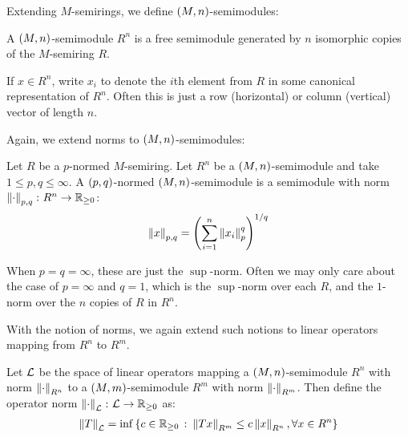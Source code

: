Extending \(M\)-semirings,
we define \(\left(M, n\right)\)-semimodules:

\begin{definition}
  A \(\left(M, n\right)\)-semimodule \(R ^n\)
  is a free semimodule generated by \(n\) isomorphic copies of
  the \(M\)-semiring \(R\).
\end{definition}

If \(x \in R ^n\), write \(x_i\) to denote the \(i\)th element from
\(R\) in some canonical representation of \(R ^n\).
Often this is just a row (horizontal) or column (vertical)
vector of length \(n\).

Again, we extend norms to \(\left(M, n\right)\)-semimodules:

\begin{definition}
  Let \(R\) be a \(p\)-normed \(M\)-semiring.
  Let \(R ^n\) be a \(\left(M, n\right)\)-semimodule
  and take \(1 \leq p, q \leq \infty\).
  A \(\left(p, q\right)\)-normed \(\left(M, n\right)\)-semimodule
  is a semimodule with norm \(\left\lVert\cdot\right\rVert_{p, q} \colon R^n \to \mathbb{R}_{\geq 0}\):
  \begin{align*}
    \left\lVert x\right\rVert_{p, q}
      = \left(\sum_{i = 1}^{n} \left\lVert x_i\right\rVert_{p}^q\right)^{1 / q}
  \end{align*}
\end{definition}

When \(p = q = \infty\), these are just the \(\sup\)-norm.
Often we may only care about the case of \(p = \infty\) and \(q = 1\),
which is the \(\sup\)-norm over each \(R\),
and the \(1\)-norm over the \(n\) copies of \(R\) in \(R^n\).

With the notion of norms, we again extend such notions to
linear operators mapping from \(R^n\) to \(R^m\).

\begin{definition}
  Let \(\mathcal{L}\) be the space of linear operators mapping
  a \(\left(M, n\right)\)-semimodule \(R^n\) with norm \(\left\lVert\cdot\right\rVert_{R^n}\)
  to a \(\left(M, m\right)\)-semimodule \(R^m\) with norm \(\left\lVert\cdot\right\rVert_{R^m}\).
  Then define the operator norm
  \(\left\lVert\cdot\right\rVert_{\mathcal{L}} \colon \mathcal{L} \to \mathbb{R}_{\geq 0}\) as:
  \begin{align*}
    \left\lVert T\right\rVert_{\mathcal{L}} =
      \inf \left\{c \in \mathbb{R}_{\geq 0} \ \colon
              \left\lVert Tx\right\rVert_{R^m}
                \leq c \left\lVert x\right\rVert_{R^n},
              \forall x \in R^n\right\}
  \end{align*}
\end{definition}


